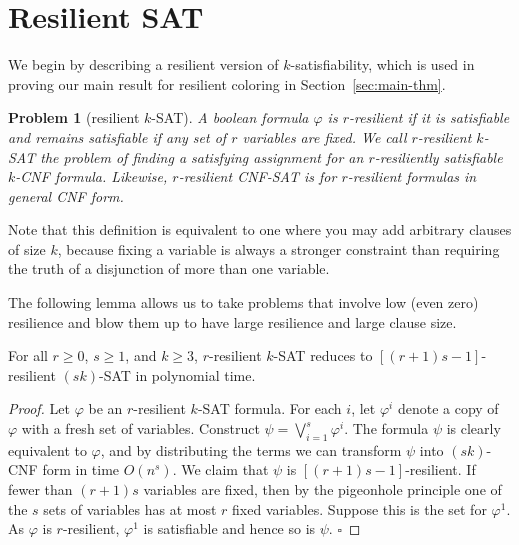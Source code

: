 \documentclass{llncs}
\newtheorem{prob}{Problem}
\begin{document}
\section{Resilient SAT}\label{sec:resilient-sat}

We begin by describing a resilient version of $k$-satisfiability, which is used
in proving our main result for resilient coloring in
Section~\ref{sec:main-thm}. 

\begin{prob}[resilient $k$-SAT]
A boolean formula $\varphi$ is \emph{$r$-resilient} if it is satisfiable
and remains satisfiable if any set of $r$ variables are fixed. We call
\emph{$r$-resilient $k$-SAT} the problem of finding a satisfying assignment for
an $r$-resiliently satisfiable $k$-CNF formula. Likewise, $r$-resilient CNF-SAT
is for $r$-resilient formulas in general CNF form.  
\end{prob}

Note that this definition is equivalent to one where you may add arbitrary
clauses of size $k$, because fixing a variable is always a stronger constraint
than requiring the truth of a disjunction of more than one variable. 

The following lemma allows us to take problems that involve low (even zero)
resilience and blow them up to have large resilience and large clause size.

\begin{lemma}[blowing up]
\label{lemma:up}For all $r \geq 0$, $s \geq 1$, and $k \geq 3$, $r$-resilient
$k$-SAT reduces to $[(r+1)s-1]$-resilient $(sk)$-SAT in polynomial time.

\end{lemma}
\begin{proof}

Let $\varphi$ be an $r$-resilient $k$-SAT formula. For each $i$, let
$\varphi^i$ denote a copy of $\varphi$ with a fresh set of variables. Construct
$\psi = \bigvee_{i = 1}^s \varphi^i$. The formula $\psi$ is clearly equivalent
to $\varphi$, and by distributing the terms we can transform $\psi$ into
$(sk)$-CNF form in time $O(n^s)$. We claim that $\psi$ is $[(r+1)s -
1]$-resilient. If fewer than $(r+1)s$ variables are fixed, then by the
pigeonhole principle one of the $s$ sets of variables has at most $r$ fixed
variables. Suppose this is the set for $\varphi^1$. As $\varphi$ is
$r$-resilient, $\varphi^1$ is satisfiable and hence so is $\psi$. \hfill
$\square$ 

\end{proof}
\end{document}
